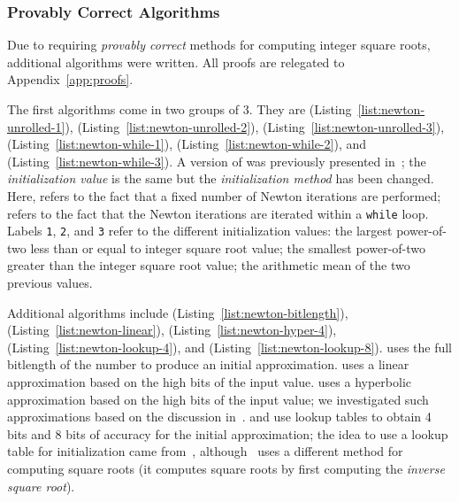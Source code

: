 





\subsubsection{Provably Correct Algorithms}

Due to requiring \emph{provably correct}
methods for computing integer square roots,
additional algorithms were written.
All proofs are relegated to Appendix~\ref{app:proofs}.

The first algorithms come in two groups of 3.
They are
\UnrolledOne{} (Listing~\ref{list:newton-unrolled-1}),
\UnrolledTwo{} (Listing~\ref{list:newton-unrolled-2}),
\UnrolledThree{} (Listing~\ref{list:newton-unrolled-3}),
\WhileOne{} (Listing~\ref{list:newton-while-1}),
\WhileTwo{} (Listing~\ref{list:newton-while-2}), and
\WhileThree{} (Listing~\ref{list:newton-while-3}).
A version of \UnrolledThree{} was previously presented
in~\cite{EfficientIsqrt};
the \emph{initialization value} is the same but
the \emph{initialization method} has been changed.
Here, \unrolled{} refers to the fact that a fixed number of Newton iterations
are performed;
\while{} refers to the fact that the Newton iterations are iterated
within a \texttt{while} loop.
Labels \texttt{1}, \texttt{2}, and \texttt{3}
refer to the different initialization values:
the largest power-of-two less than or equal to integer square root value;
the smallest power-of-two greater than the integer square root value;
the arithmetic mean of the two previous values.

Additional algorithms include
\BitLength{} (Listing~\ref{list:newton-bitlength}),
\Linear{} (Listing~\ref{list:newton-linear}),
\HyperFour{} (Listing~\ref{list:newton-hyper-4}),
\LookupFour{} (Listing~\ref{list:newton-lookup-4}), and
\LookupEight{} (Listing~\ref{list:newton-lookup-8}).
\BitLength{} uses the full bitlength of the number to produce
an initial approximation.
\Linear{} uses a linear approximation based on the high bits
of the input value.
\HyperFour{} uses a hyperbolic approximation
based on the high bits of the input value;
we investigated such approximations
based on the discussion in~\cite{WikiSqrtHyper}.
\LookupFour{} and \LookupEight{} use lookup tables
to obtain 4 bits and 8 bits of accuracy for the initial approximation;
the idea to use a lookup table for initialization
came from~\cite{WikiSqrtBinary,FormalVerIsqrt},
although~\cite{FormalVerIsqrt} uses a different method for
computing square roots
(it computes square roots by first computing the \emph{inverse square root}).

